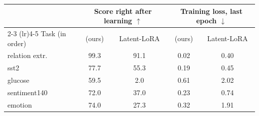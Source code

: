 \begin{tabular}{lcccc}
    \toprule
    & \multicolumn{2}{c}{Score right after learning $\uparrow$} & \multicolumn{2}{c}{Training loss, last epoch $\downarrow$} \\
    \cmidrule(lr){2-3} \cmidrule(lr){4-5}
    Task (in order) & \cert{} (ours) & Latent-LoRA & \cert{} (ours) & Latent-LoRA \\
    \midrule
    relation extr. & 99.3 & 91.1 & 0.02 & 0.40 \\
    sst2 & 77.7 & 55.3 & 0.19 & 0.45 \\
    glucose & 59.5 & 2.0 & 0.61 & 2.02 \\
    sentiment140 & 72.0 & 37.0 & 0.23 & 0.74 \\
    emotion & 74.0 & 27.3 & 0.32 & 1.91 \\
    \bottomrule
\end{tabular}
